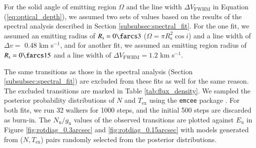 \documentclass[linenumbers, twocolumn, twocolappendix, astrosymb, times]{aastex631}
\begin{document}
For the solid angle of emitting region $\Omega$ and the line width $\Delta V_\mathrm{FWHM}$ in Equation (\ref{eq:optical_depth}), we assumed two sets of values based on the results of the spectral analysis described in Section \ref{subsubsec:spectral_fit}. For the one fit, we assumed an emitting radius of $R_\mathrm{s} = 0\farcs3$ ($\Omega = \pi R_\mathrm{s}^2\cos i$) and a line width of $\Delta v = $ 0.48 km s$^{-1}$, and for another fit, we assumed an emitting region radius of $R_\mathrm{s} = 0\farcs15$ and a line width of $\Delta V_\mathrm{FWHM} = 1.2$ km s$^{-1}$. 

The same transitions as those in the spectral analysis (Section \ref{subsubsec:spectral_fit}) are excluded from these fits as well for the same reason. The excluded transitions are marked in Table \ref{tab:flux_density}. We sampled the posterior probability distributions of $N$ and $T_\mathrm{ex}$ using the \texttt{emcee} package \citep{emcee}. For both fits, we run 32 walkers for 1000 steps, and the initial 500 steps are discarded as burn-in. The $N_\mathrm{u}/g_\mathrm{u}$ values of the observed transitions are plotted against $E_\mathrm{u}$ in Figure \ref{fig:rotdiag_0.3arcsec} and \ref{fig:rotdiag_0.15arcsec} with models generated from ($N, T_\mathrm{ex}$) pairs randomly selected from the posterior distributions.
\end{document}
